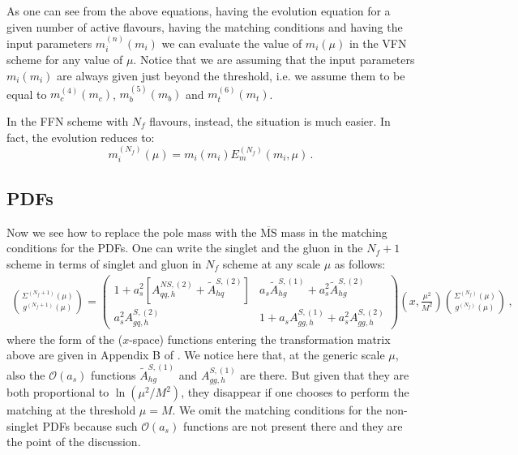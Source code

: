 \documentclass[10pt,a4paper]{article}
\begin{document}
As one can see from the above equations, having the evolution equation for a given number of active flavours, having the matching conditions and having the input parameters $m_i^{(n)}(m_i)$ we can evaluate the value of $m_i(\mu)$ in the VFN scheme for any value of $\mu$. Notice that we are assuming that the input parameters $m_i(m_i)$ are always given just beyond the threshold, i.e. we assume them to be equal to $m_c^{(4)}(m_c)$, $m_b^{(5)}(m_b)$ and $m_t^{(6)}(m_t)$. 

In the FFN scheme with $N_f$ flavours, instead, the situation is much easier. In fact, the evolution reduces to:
\begin{equation}
m_i^{(N_f)}(\mu) = m_i(m_i)E_m^{(N_f)}(m_i,\mu)\,.
\end{equation} 


\subsection{PDFs}

Now we see how to replace the pole mass with the $\overline{\mbox{MS}}$ mass in the matching conditions for the PDFs. One can write the singlet and the gluon in the $N_f+1$ scheme in terms of singlet and gluon in $N_f$ scheme at any scale $\mu$ as follows:
\begin{equation}\label{couple1}
\begin{array}{c}
\displaystyle {\Sigma^{(N_f+1)}(\mu) \choose g^{(N_f+1)}(\mu)}=\begin{pmatrix}1+a_s^2[A_{qq,h}^{N\!S,(2)}+\tilde{A}^{S,(2)}_{hq}] & a_s\tilde{A}^{S,(1)}_{hg}+a_s^2\tilde{A}^{S,(2)}_{hg}\\
a_s^2A^{S,(2)}_{gq,h} & 1+a_sA_{gg,h}^{S,(1)}+a_s^2A_{gg,h}^{S,(2)}\end{pmatrix}\left(x,\frac{\mu^2}{M^2}\right){\Sigma^{(N_f)}(\mu) \choose g^{(N_f)}(\mu)}\,,
\end{array}
\end{equation}
where the form of the ($x$-space) functions entering the transformation matrix above are given in Appendix B of \cite{Buza:1996wv}. We notice here that, at the generic scale $\mu$, also the $\mathcal{O}(a_s)$ functions $\tilde{A}^{S,(1)}_{hg}$ and $A_{gg,h}^{S,(1)}$ are there. But given that they are both proportional to $\ln(\mu^2/M^2)$, they disappear if one chooses to perform the matching at the threshold $\mu=M$. We omit the matching conditions for the non-singlet PDFs because such $\mathcal{O}(a_s)$ functions are not present there and they are the point of the discussion.
\end{document}
